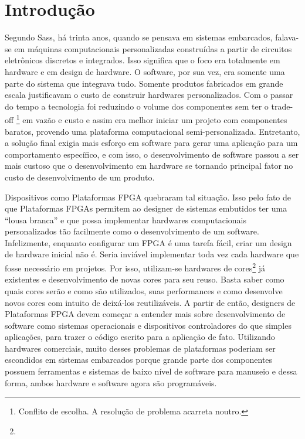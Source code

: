 \chapter{Introdução}
\label{chap:introducao}

Segundo Sass, há trinta anos, quando se pensava em sistemas embarcados, falava-se em máquinas computacionais personalizadas construídas a partir de circuitos eletrônicos discretos e integrados. Isso significa que o foco era totalmente em hardware e em design de hardware. O software, por sua vez, era somente uma parte do sistema que integrava tudo. Somente produtos fabricados em grande escala justificavam o custo de construir hardwares personalizados. Com o passar do tempo a tecnologia foi reduzindo o volume dos componentes sem ter o trade-off \footnote{Conflito de escolha. A resolução de problema acarreta noutro.} em vazão e custo e assim era melhor iniciar um projeto com componentes baratos, provendo uma plataforma computacional semi-personalizada. Entretanto, a solução final exigia mais esforço em software para gerar uma aplicação para um comportamento específico, e com isso, o desenvolvimento de software passou a ser mais custoso que o desenvolvimento em hardware se tornando principal fator no custo de desenvolvimento de um produto. 



Dispositivos como Plataformas FPGA quebraram tal situação. Isso pelo fato de que Plataformas FPGAs permitem ao designer de sistemas embutidos ter uma “lousa branca” e que possa implementar hardwares computacionais personalizados tão facilmente como o desenvolvimento de um software. Infelizmente, enquanto configurar um FPGA é uma tarefa fácil, criar um design de hardware inicial não é. Seria inviável implementar toda vez cada hardware que fosse necessário em projetos. Por isso, utilizam-se hardwares de cores\footnote{} já existentes e desenvolvimento de novas cores para seu reuso. Basta saber como quais cores serão e como são utilizados, suas performances e como desenvolve novos cores com intuito de deixá-los reutilizáveis.
A partir de então, designers de Plataformas FPGA devem começar a entender mais sobre desenvolvimento de software como sistemas operacionais e dispositivos controladores do que simples aplicações, para trazer o código escrito para a aplicação de fato. Utilizando hardwares comerciais, muito desses problemas de plataformas poderiam ser escondidos em sistemas embarcados porque grande parte dos componentes possuem ferramentas e sistemas de baixo nível de software para manuseio e dessa forma, ambos hardware e software agora são programáveis.


